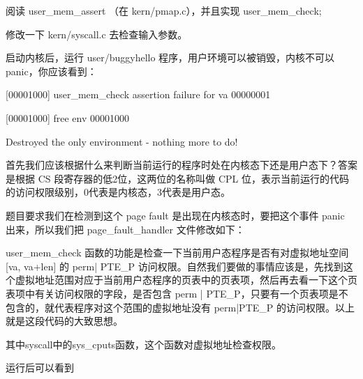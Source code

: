 \begin{ExerciseList}
阅读 user\_mem\_assert （在 kern/pmap.c），并且实现 user\_mem\_check;

修改一下 kern/syscall.c 去检查输入参数。

启动内核后，运行 user/buggyhello 程序，用户环境可以被销毁，内核不可以panic，你应该看到：

[00001000] user\_mem\_check assertion failure for va 00000001

[00001000] free env 00001000

Destroyed the only environment - nothing more to do!

首先我们应该根据什么来判断当前运行的程序时处在内核态下还是用户态下？答案是根据 CS 段寄存器的低2位，这两位的名称叫做 CPL 位，表示当前运行的代码的访问权限级别，0代表是内核态，3代表是用户态。

题目要求我们在检测到这个 page fault 是出现在内核态时，要把这个事件 panic 出来，所以我们把 page\_fault\_handler 文件修改如下：

user\_mem\_check 函数的功能是检查一下当前用户态程序是否有对虚拟地址空间 [va, va+len] 的 perm| PTE\_P 访问权限。自然我们要做的事情应该是，先找到这个虚拟地址范围对应于当前用户态程序的页表中的页表项，然后再去看一下这个页表项中有关访问权限的字段，是否包含 perm | PTE\_P，只要有一个页表项是不包含的，就代表程序对这个范围的虚拟地址没有 perm|PTE\_P 的访问权限。以上就是这段代码的大致思想。

其中syscall中的sys\_cputs函数，这个函数对虚拟地址检查权限。

运行后可以看到


\end{ExerciseList}
